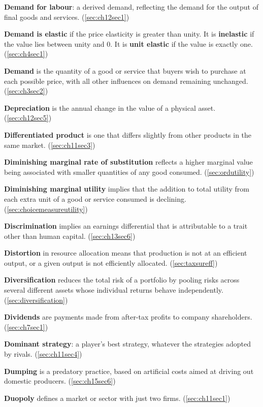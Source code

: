 \textbf{Demand for labour}: a derived demand, reflecting the demand for the output of final goods and services. (\ref{sec:ch12sec1})

\textbf{Demand is elastic} if the price elasticity is greater than unity. It is \textbf{inelastic} if the value lies between unity and 0. It is \textbf{unit elastic} if the value is exactly one. (\ref{sec:ch4sec1})

\textbf{Demand} is the quantity of a good or service that buyers wish to purchase at each possible price, with all other influences on demand remaining unchanged. (\ref{sec:ch3sec2})

\textbf{Depreciation} is the annual change in the value of a physical asset. (\ref{sec:ch12sec5})

\textbf{Differentiated product} is one that differs slightly from other products in the same market. (\ref{sec:ch11sec3})

\textbf{Diminishing marginal rate of substitution} reflects a higher marginal value being associated with smaller quantities of any good consumed. (\ref{sec:ordutility})

\textbf{Diminishing marginal utility} implies that the addition to total utility from each extra unit of a good or service consumed is declining. (\ref{sec:choicemeasureutility})

\textbf{Discrimination} implies an earnings differential that is attributable to a trait other than human capital. (\ref{sec:ch13sec6})

\textbf{Distortion} in resource allocation means that production is not at an efficient output, or a given output is not efficiently allocated. (\ref{sec:taxsureff})

\textbf{Diversification} reduces the total risk of a portfolio by pooling risks across several different assets whose individual returns behave independently. (\ref{sec:diversification})

\textbf{Dividends} are payments made from after-tax profits to company shareholders. (\ref{sec:ch7sec1})

\textbf{Dominant strategy}: a player's best strategy, whatever the strategies adopted by rivals. (\ref{sec:ch11sec4})

\textbf{Dumping} is a predatory practice, based on artificial costs aimed at driving out domestic producers. (\ref{sec:ch15sec6})

\textbf{Duopoly} defines a market or sector with just two firms. (\ref{sec:ch11sec1})

